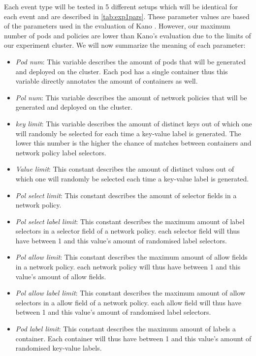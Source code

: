 Each event type will be tested in 5 different setups which will be identical for each event and are described in \autoref{tab:exp1pars}. These parameter values are based of the parameters used in the evaluation of Kano \cite{kano}. However, our maximum number of pods and policies are lower than Kano's evaluation due to the limits of our experiment cluster. We will now summarize the meaning of each parameter:
\begin{itemize}
    \item \textit{Pod num}: This variable describes the amount of pods that will be generated and deployed on the cluster. Each pod has a single container thus this variable directly annotates the amount of containers as well.
    \item \textit{Pol num}: This variable describes the amount of network policies that will be generated and deployed on the cluster.
    \item \textit{key limit}: This variable describes the amount of distinct keys out of which one will randomly be selected for each time a key-value label is generated. The lower this number is the higher the chance of matches between containers and network policy label selectors.
    \item \textit{Value limit}: This constant describes the amount of distinct values out of which one will randomly be selected each time a key-value label is generated.
    \item \textit{Pol select limit}: This constant describes the amount of selector fields in a network policy.
    \item \textit{Pol select label limit}: This constant describes the maximum amount of label selectors in a selector field of a network policy. each selector field will thus have between 1 and this value's amount of randomised label selectors.
    \item \textit{Pol allow limit}: This constant describes the maximum amount of allow fields in a network policy. each network policy  will thus have between 1 and this value's amount of allow fields.
    \item \textit{Pol allow label limit}: This constant describes the maximum amount of allow selectors in a allow field of a network policy. each allow field will thus have between 1 and this value's amount of randomised label selectors.
     \item \textit{Pod label limit}: This constant describes the maximum amount of labels a container. Each container will thus have between 1 and this value's amount of randomised key-value labels.
\end{itemize}

